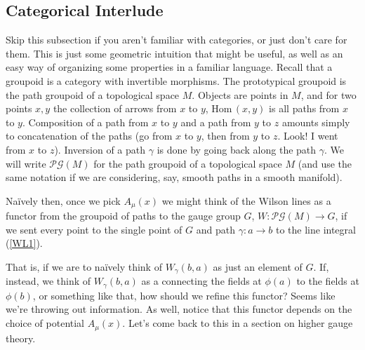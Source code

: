 \documentclass[main.tex]{subfiles}
\begin{document}
\subsection{Categorical Interlude}
Skip this subsection if you aren't familiar with categories, or just don't care for them. This is just some geometric intuition that might be useful, as well as an easy way of organizing some properties in a familiar language. Recall that a groupoid is a category with invertible morphisms. The prototypical groupoid is the path groupoid of a topological space $M$. Objects are points in $M$, and for two points $x,y$ the collection of arrows from $x$ to $y$, $\text{Hom} \, (x,y)$ is all paths from $x$ to $y$. Composition of a path from $x$ to $y$ and a path from $y$ to $z$ amounts simply to concatenation of the paths (go from $x$ to $y$, then from $y$ to $z$. Look! I went from $x$ to $z$). Inversion of a path $\gamma$ is done by going back along the path $\gamma$. We will write $\mathcal{PG}(M)$ for the path groupoid of a topological space $M$ (and use the same notation if we are considering, say, smooth paths in a smooth manifold).

Na\"ively then, once we pick $A_\mu (x)$ we might think of the Wilson lines as a functor from the groupoid of paths to the gauge group $G$, $W: \mathcal{PG}(M) \rightarrow G$, if we sent every point to the single point of $G$ and path $\gamma: a \to b$ to the line integral (\ref{WL1}).

That is, if we are to na\"ively think of $W_\gamma(b,a)$ as just an element of $G$. If, instead, we think of $W_\gamma (b,a)$ as a connecting the fields at $\phi(a)$ to the fields at $\phi(b)$, or something like that, how should we refine this functor? Seems like we're throwing out information. As well, notice that this functor depends on the choice of potential $A_\mu (x)$. Let's come back to this in a section on higher gauge theory. 
\end{document}
